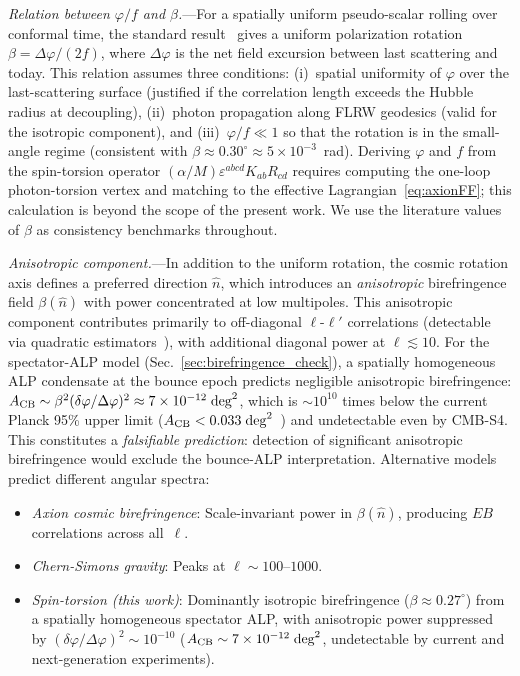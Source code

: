 \documentclass[aps,prd,twocolumn,superscriptaddress,showpacs,preprintnumbers,nofootinbib,longbibliography,floatfix]{revtex4-2}
\begin{document}
\textit{Relation between $\varphi/f$ and $\beta$.}---For a spatially uniform pseudo-scalar rolling over conformal time, the standard result~\cite{CarrollFieldJackiw1990,Carroll1998} gives a uniform polarization rotation $\beta = \Delta\varphi/(2f)$, where $\Delta\varphi$ is the net field excursion between last scattering and today. This relation assumes three conditions: (i)~spatial uniformity of $\varphi$ over the last-scattering surface (justified if the correlation length exceeds the Hubble radius at decoupling), (ii)~photon propagation along FLRW geodesics (valid for the isotropic component), and (iii)~$\varphi/f\ll 1$ so that the rotation is in the small-angle regime (consistent with $\beta\approx 0.30^\circ \approx 5\times 10^{-3}$~rad). Deriving $\varphi$ and $f$ from the spin-torsion operator $(\alpha/M)\varepsilon^{abcd}K_{ab}R_{cd}$ requires computing the one-loop photon-torsion vertex and matching to the effective Lagrangian~\eqref{eq:axionFF}; this calculation is beyond the scope of the present work. We use the literature values of $\beta$ as consistency benchmarks throughout.

\textit{Anisotropic component.}---In addition to the uniform rotation, the cosmic rotation axis defines a preferred direction $\hat{n}$, which introduces an \textit{anisotropic} birefringence field $\beta(\hat{n})$ with power concentrated at low multipoles. This anisotropic component contributes primarily to off-diagonal $\ell$-$\ell'$ correlations (detectable via quadratic estimators~\cite{Eskilt2022}), with additional diagonal power at $\ell\lesssim 10$. For the spectator-ALP model (Sec.~\ref{sec:birefringence_check}), a spatially homogeneous ALP condensate at the bounce epoch predicts negligible anisotropic birefringence: $A_{\rm CB} \sim \beta^2 (\delta\varphi/\Delta\varphi)^2 \approx 7 \times 10^{-12}\;\text{deg}^2$, which is ${\sim}10^{10}$ times below the current Planck 95\% upper limit ($A_{\rm CB} < 0.033\;\text{deg}^2$~\cite{Namikawa2020}) and undetectable even by CMB-S4. This constitutes a \emph{falsifiable prediction}: detection of significant anisotropic birefringence would exclude the bounce-ALP interpretation. Alternative models predict different angular spectra:
\begin{itemize}[leftmargin=*]
\item \textit{Axion cosmic birefringence}: Scale-invariant power in $\beta(\hat{n})$, producing $EB$ correlations across all~$\ell$.
\item \textit{Chern-Simons gravity}: Peaks at $\ell\sim 100$--$1000$.
\item \textit{Spin-torsion (this work)}: Dominantly isotropic birefringence ($\beta \approx 0.27^\circ$) from a spatially homogeneous spectator ALP, with anisotropic power suppressed by $({\delta\varphi}/{\Delta\varphi})^2 \sim 10^{-10}$ ($A_{\rm CB} \sim 7 \times 10^{-12}\;\text{deg}^2$, undetectable by current and next-generation experiments).
\end{itemize}
\end{document}
